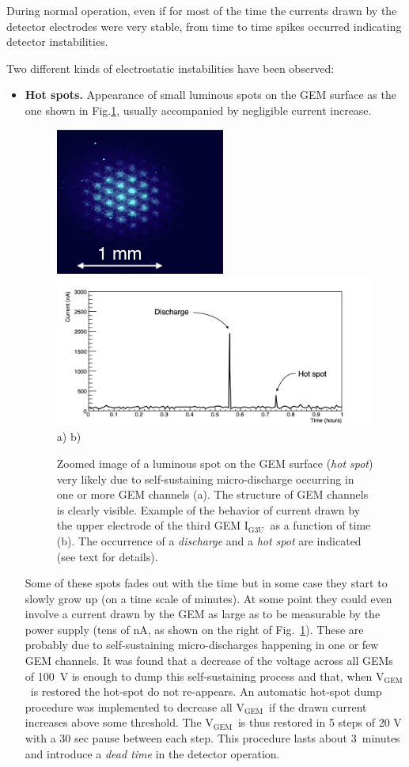 \documentclass[a4paper,11pt]{article}
\newcommand{\Ig}  {I$_{\mathrm{G3U}}$}
\newcommand{\Vg}  {V$_{\mathrm{GEM}}$}
\begin{document}
During normal operation, even if for most of the time the currents drawn by the detector electrodes were very stable, 
from time to time spikes occurred indicating detector instabilities.

Two different kinds of electrostatic instabilities have been observed:

\begin{itemize}
\item {\bf Hot spots.} Appearance of small luminous spots on the GEM surface as the one shown in Fig.\ref{fig:hotspot}, usually accompanied by negligible current increase.
\begin{figure}[ht]
	\centering
	\includegraphics[width=0.29\linewidth]{Figures/hot_spot.png}
	\includegraphics[width=0.60\linewidth]{Figures/c2_hot_discharge.png}\\
\hspace{-2.5cm} \mbox{a)} \hspace{6.5cm} \mbox{b)}
\vspace{-0.3cm}

  	\caption{Zoomed image of a luminous spot on the GEM surface ({\it hot spot}) very likely due to self-sustaining micro-discharge occurring in one or more GEM channels (a). The structure of GEM channels is clearly visible. Example of the behavior of current drawn by the upper electrode of the third GEM \Ig\ as a function of time (b). The occurrence of a {\it discharge} and a {\it hot spot} are indicated (see text for details).}
  	\label{fig:hotspot}
\end{figure}

Some of these spots fades out with the time but in some case they start to slowly grow up (on a time scale of minutes). At some point they could even involve a current drawn by the GEM as large as to be measurable by the power supply (tens of nA, as shown on the right of Fig.~\ref{fig:hotspot}). These are probably due to self-sustaining micro-discharges happening in one or few GEM channels. It was found that a decrease of the voltage across all GEMs of 100~V is enough to dump this self-sustaining process and that, when \Vg\ is restored the hot-spot do not re-appears. An automatic hot-spot dump procedure was implemented to decrease all \Vg\ if the drawn current increases above some threshold. The \Vg\ is thus restored in 5 steps of 20 V with a 30 sec pause between each step. This procedure lasts about 3~minutes and introduce a {\it dead time} in the detector operation.



\end{itemize}
\end{document}
